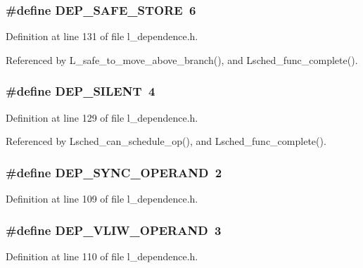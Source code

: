 \subsubsection{\setlength{\rightskip}{0pt plus 5cm}\#define DEP\_\-SAFE\_\-STORE~6}\label{l__dependence_8h_2f9ca3b96f1a67be58b18f78caea81b1}




Definition at line 131 of file l\_\-dependence.h.

Referenced by L\_\-safe\_\-to\_\-move\_\-above\_\-branch(), and Lsched\_\-func\_\-complete().
\subsubsection{\setlength{\rightskip}{0pt plus 5cm}\#define DEP\_\-SILENT~4}\label{l__dependence_8h_88c64501bb0da9a0a6ebccdd444ed621}




Definition at line 129 of file l\_\-dependence.h.

Referenced by Lsched\_\-can\_\-schedule\_\-op(), and Lsched\_\-func\_\-complete().
\subsubsection{\setlength{\rightskip}{0pt plus 5cm}\#define DEP\_\-SYNC\_\-OPERAND~2}\label{l__dependence_8h_14c0cbe25fab7704fb5d4b491c096dab}




Definition at line 109 of file l\_\-dependence.h.
\subsubsection{\setlength{\rightskip}{0pt plus 5cm}\#define DEP\_\-VLIW\_\-OPERAND~3}\label{l__dependence_8h_3326c6a5979f6eb3961e3d2142cd9b7f}




Definition at line 110 of file l\_\-dependence.h.

